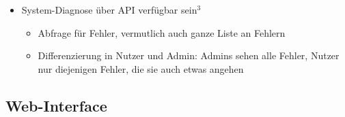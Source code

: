 \begin{itemize}
    \item System-Diagnose über API verfügbar sein$^3$
        \begin{itemize}
            \item Abfrage für Fehler, vermutlich auch ganze Liste an Fehlern
            \item Differenzierung in Nutzer und Admin: Admins sehen alle Fehler, Nutzer nur diejenigen Fehler, die sie auch etwas angehen
        \end{itemize}
\end{itemize}



\subsection{Web-Interface}



